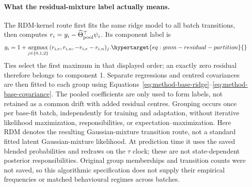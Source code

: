 \paragraph{What the residual-mixture label actually means.}
\label{sec:residual-mixture-fit}\hypertarget{sec:residual-mixture-fit}{}
The RDM-kernel route first fits the same ridge model to all batch transitions,
then computes \(r_i=y_i-\widehat\Theta_{\rm pool}^\top\psi_i\). Its component
label is
\begin{align}
 g_i=1+\underset{j\in\{0,1,2\}}{\operatorname{argmax}}\,
       (r_{i,e},r_{i,n},-r_{i,e}-r_{i,n})_j .
 \label{eq:gmm-residual-partition}\hypertarget{eq:gmm-residual-partition}{}
\end{align}
Ties select the first maximum in that displayed order; an exactly zero
residual therefore belongs to component 1. Separate regressions and centred
covariances are then fitted to each group using
Equations~\eqref{eq:method-base-ridge}--\eqref{eq:method-base-covariance}.
The pooled coefficients are only used to form labels, not retained as a
common drift with added residual centres. Grouping occurs once per base-fit
batch, independently for training and adaptation, without iterative
likelihood maximization, responsibilities, or expectation--maximization.
Here RDM denotes the resulting Gaussian-mixture transition route, not a
standard fitted latent Gaussian-mixture likelihood. At prediction time it
uses the saved blended probabilities and redraws on the \(\tau\) clock;
these are not state-dependent posterior responsibilities. Original group
memberships and transition counts were not saved, so this algorithmic
specification does not supply their empirical frequencies or matched
behavioural regimes across batches.

